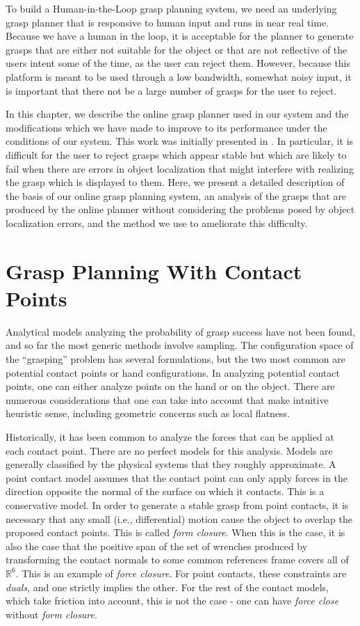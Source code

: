 To build a Human-in-the-Loop grasp planning system, we need an underlying grasp planner that is responsive to human input and runs in near real time. Because we have a human in the loop, it is acceptable for the planner to generate grasps that are either not suitable for the object or that are not reflective of the users intent some of the time, as the user can reject them. However, because this platform is meant to be used through a low bandwidth, somewhat noisy input, it is important that there not be a large number of grasps for the user to reject. 

In this chapter, we describe the online grasp planner used in our system and the modifications which we have made to improve to its performance under the conditions of our system. This work was initially presented in \cite{Weisz2012}. In particular, it is difficult for the user to reject grasps which appear stable but which are likely to fail when there are errors in object localization that might interfere with realizing the grasp which is displayed to them. Here, we present a detailed description of the basis of our online grasp planning system, an analysis of the grasps that are produced by the online planner without considering the problems posed by object localization errors, and the method we use to ameliorate this difficulty. 

\section{Grasp Planning With Contact Points}

Analytical models analyzing the probability of grasp success have not been found, and so far the most generic methods involve sampling. The configuration space of the ``grasping'' problem has several formulations, but the two most common are potential contact points or hand configurations. In analyzing potential contact points, one can either analyze points on the hand or on the object. There are numerous considerations that one can take into account that make intuitive heuristic sense, including geometric concerns such as local flatness. 

Historically, it has been common to analyze the forces that can be applied at each contact point. There are no perfect models for this analysis. Models are generally classified by the physical systems that they roughly approximate. A point contact model assumes that the contact point can only apply forces in the direction opposite the normal of the surface on which it contacts. This is a conservative model. In order to generate a stable grasp from point contacts, it is necessary that any small (i.e., differential) motion cause the object to overlap the proposed contact points. This is called \emph{form closure}. When this is the case, it is also the case that the positive span of the set of wrenches produced by transforming the contact normals to some common references frame covers all of $\mathbb{R}^6$. This is an example of \emph{force closure}. For point contacts, these constraints are \emph{duals}, and one strictly implies the other. For the rest of the contact models, which take friction into account, this is not the case - one can have \emph{force close} without \emph{form closure}. 


